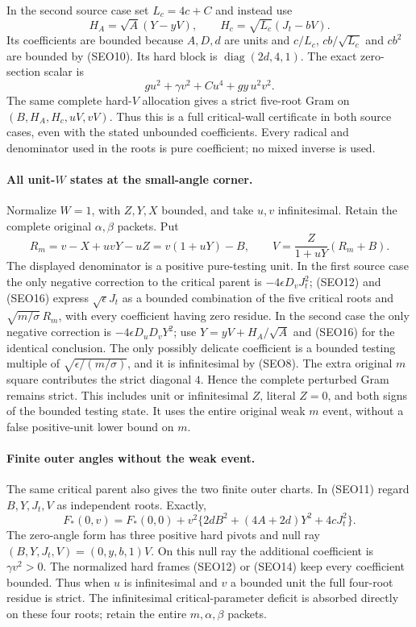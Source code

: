 In the second source case set $L_c=4c+C$ and instead use
\[
 H_A=\sqrt A(Y-yV),\qquad
 H_c=\sqrt{L_c}(J_t-bV).                         \tag{SEO14}
\]
Its coefficients are bounded because $A,D,d$ are units and
$c/L_c$, $cb/\sqrt{L_c}$ and $cb^2$ are bounded by (SEO10).
Its hard block is $\operatorname{diag}(2d,4,1)$.
The exact zero-section scalar is
\[
 g u^2+\gamma v^2+C u^4+gy\,u^2v^2.
 \tag{SEO15}
\]
The same complete hard-$V$ allocation gives a strict five-root
Gram on $(B,H_A,H_c,uV,vV)$. Thus this is a full critical-wall
certificate in both source cases, even with the stated unbounded
coefficients. Every radical and denominator used in the roots is
pure coefficient; no mixed inverse is used.

\paragraph{All unit-$W$ states at the small-angle corner.}
Normalize $W=1$, with $Z,Y,X$ bounded, and take $u,v$ infinitesimal.
Retain the complete original $\alpha,\beta$ packets. Put
\[
 R_m=v-X+uvY-uZ=v(1+uY)-B,\qquad
 V=\frac{Z}{1+uY}(R_m+B).                        \tag{SEO16}
\]
The displayed denominator is a positive pure-testing unit.
In the first source case the only negative correction to the
critical parent is $-4\epsilon D_vJ_t^2$; (SEO12) and (SEO16)
express $\sqrt\epsilon J_t$ as a bounded combination of the five
critical roots and $\sqrt{m/\sigma}\,R_m$, with every coefficient
having zero residue. In the second case the only negative
correction is $-4\epsilon D_uD_vY^2$; use
$Y=yV+H_A/\sqrt A$ and (SEO16) for the identical conclusion.
The only possibly delicate coefficient is a bounded testing
multiple of $\sqrt{\epsilon/(m/\sigma)}$, and it is infinitesimal
by (SEO8). The extra original $m$ square contributes the strict
diagonal $4$. Hence the complete perturbed Gram remains strict.
This includes unit or infinitesimal $Z$, literal $Z=0$, and both
signs of the bounded testing state. It uses the entire original
weak $m$ event, without a false positive-unit lower bound on $m$.

\paragraph{Finite outer angles without the weak event.}
The same critical parent also gives the two finite outer charts.
In (SEO11) regard $B,Y,J_t,V$ as independent roots. Exactly,
\[
 F_*(0,v)=F_*(0,0)
       +v^2\{2dB^2+(4A+2d)Y^2+4cJ_t^2\}.       \tag{SEO17}
\]
The zero-angle form has three positive hard pivots and null ray
$(B,Y,J_t,V)=(0,y,b,1)V$. On this null ray the additional
coefficient is $\gamma v^2>0$. The normalized hard frames
(SEO12) or (SEO14) keep every coefficient bounded. Thus when
$u$ is infinitesimal and $v$ a bounded unit the full four-root
residue is strict. The infinitesimal critical-parameter deficit
is absorbed directly on these four roots; retain the entire
$m,\alpha,\beta$ packets.

